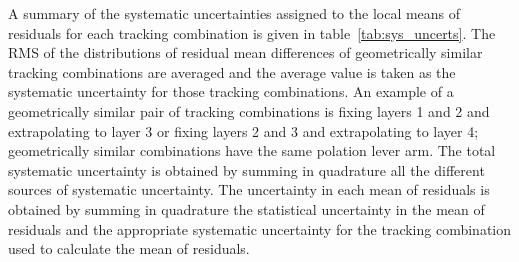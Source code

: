 



A summary of the systematic uncertainties assigned to the local means of residuals for each tracking combination is given in table~\ref{tab:sys_uncerts}. The RMS of the distributions of residual mean differences of geometrically similar tracking combinations are averaged and the average value is taken as the systematic uncertainty for those tracking combinations. An example of a geometrically similar pair of tracking combinations is fixing layers 1 and 2 and extrapolating to layer 3 or fixing layers 2 and 3 and extrapolating to layer 4; geometrically similar combinations have the same polation lever arm. The total systematic uncertainty is obtained by summing in quadrature all the different sources of systematic uncertainty. The uncertainty in each mean of residuals is obtained by summing in quadrature the statistical uncertainty in the mean of residuals and the appropriate systematic uncertainty for the tracking combination used to calculate the mean of residuals.

